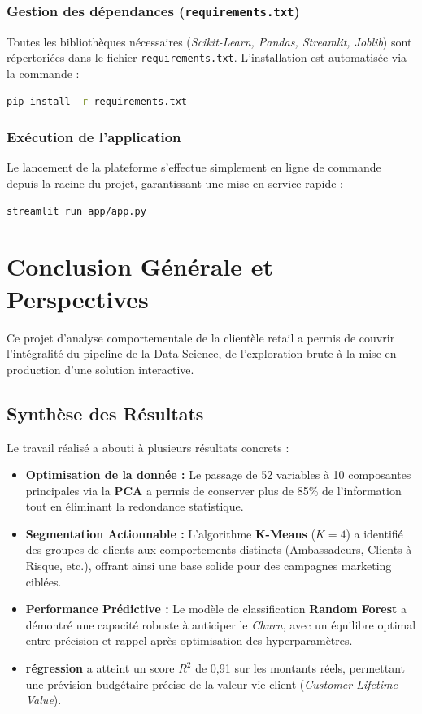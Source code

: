 \documentclass[11pt,a4paper]{article}
\begin{document}
\subsubsection{Gestion des dépendances (\texttt{requirements.txt})}
Toutes les bibliothèques nécessaires (\textit{Scikit-Learn, Pandas, Streamlit, Joblib}) sont répertoriées dans le fichier \texttt{requirements.txt}. L'installation est automatisée via la commande :
\begin{lstlisting}[language=bash]
pip install -r requirements.txt
\end{lstlisting}

\subsubsection{Exécution de l'application}
Le lancement de la plateforme s'effectue simplement en ligne de commande depuis la racine du projet, garantissant une mise en service rapide :
\begin{lstlisting}[language=bash]
streamlit run app/app.py
\end{lstlisting}


\section*{Conclusion Générale et Perspectives}

Ce projet d'analyse comportementale de la clientèle retail a permis de couvrir l'intégralité du pipeline de la Data Science, de l'exploration brute à la mise en production d'une solution interactive.

\subsection*{Synthèse des Résultats}
Le travail réalisé a abouti à plusieurs résultats concrets :
\begin{itemize}
    \item \textbf{Optimisation de la donnée :} Le passage de 52 variables à 10 composantes principales via la \textbf{PCA} a permis de conserver plus de 85\% de l'information tout en éliminant la redondance statistique.
    \item \textbf{Segmentation Actionnable :} L'algorithme \textbf{K-Means} ($K=4$) a identifié des groupes de clients aux comportements distincts (Ambassadeurs, Clients à Risque, etc.), offrant ainsi une base solide pour des campagnes marketing ciblées.
    \item \textbf{Performance Prédictive :} Le modèle de classification \textbf{Random Forest} a démontré une capacité robuste à anticiper le \textit{Churn}, avec un équilibre optimal entre précision et rappel après optimisation des hyperparamètres.
    \item \textbf{régression} a atteint un score $R^2$ de 0,91 sur les montants réels, permettant une prévision budgétaire précise de la valeur vie client (\textit{Customer Lifetime Value}).
\end{itemize}
\end{document}
